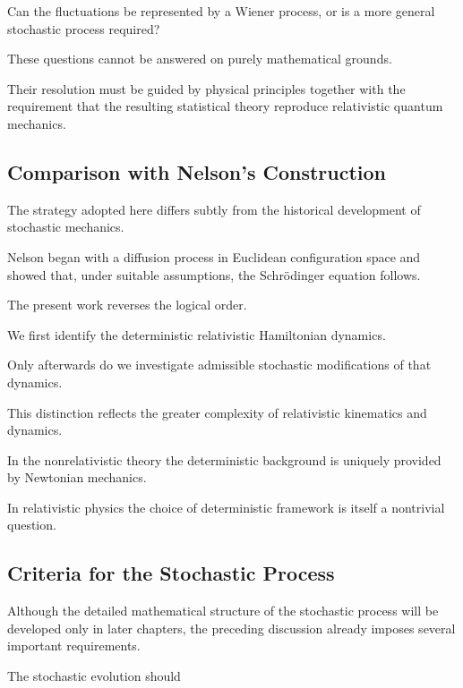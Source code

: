 Can the fluctuations be represented by a Wiener process, or is a more
general stochastic process required?

These questions cannot be answered on purely mathematical grounds.

Their resolution must be guided by physical principles together with the
requirement that the resulting statistical theory reproduce relativistic
quantum mechanics.

\subsection{Comparison with Nelson's Construction}

The strategy adopted here differs subtly from the historical
development of stochastic mechanics.

Nelson began with a diffusion process in Euclidean configuration space
and showed that, under suitable assumptions, the Schrödinger equation
follows.

The present work reverses the logical order.

We first identify the deterministic relativistic Hamiltonian dynamics.

Only afterwards do we investigate admissible stochastic modifications of
that dynamics.

This distinction reflects the greater complexity of relativistic
kinematics and dynamics.

In the nonrelativistic theory the deterministic background is uniquely
provided by Newtonian mechanics.

In relativistic physics the choice of deterministic framework is itself
a nontrivial question.

\subsection{Criteria for the Stochastic Process}

Although the detailed mathematical structure of the stochastic process
will be developed only in later chapters, the preceding discussion
already imposes several important requirements.

The stochastic evolution should

